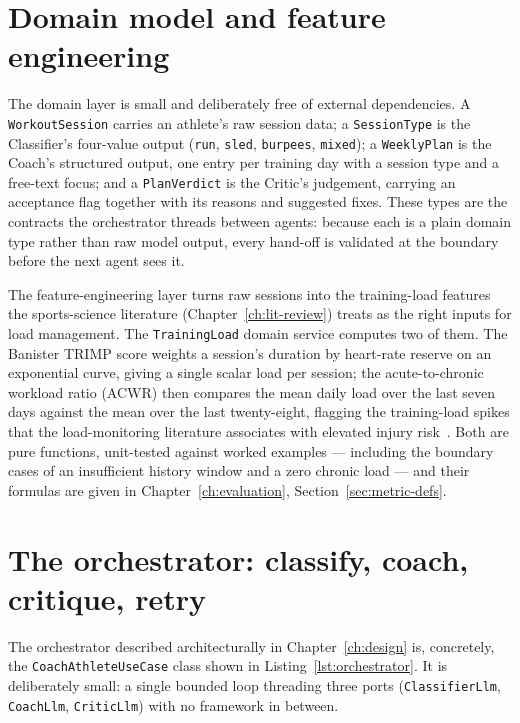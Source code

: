 \section{Domain model and feature engineering}

The domain layer is small and deliberately free of external dependencies. A \texttt{WorkoutSession} carries an athlete's raw session data; a \texttt{SessionType} is the Classifier's four-value output (\texttt{run}, \texttt{sled}, \texttt{burpees}, \texttt{mixed}); a \texttt{WeeklyPlan} is the Coach's structured output, one entry per training day with a session type and a free-text focus; and a \texttt{PlanVerdict} is the Critic's judgement, carrying an acceptance flag together with its reasons and suggested fixes. These types are the contracts the orchestrator threads between agents: because each is a plain domain type rather than raw model output, every hand-off is validated at the boundary before the next agent sees it.

The feature-engineering layer turns raw sessions into the training-load features the sports-science literature (Chapter~\ref{ch:lit-review}) treats as the right inputs for load management. The \texttt{TrainingLoad} domain service computes two of them. The Banister TRIMP score weights a session's duration by heart-rate reserve on an exponential curve, giving a single scalar load per session; the acute-to-chronic workload ratio (ACWR) then compares the mean daily load over the last seven days against the mean over the last twenty-eight, flagging the training-load spikes that the load-monitoring literature associates with elevated injury risk~\cite{gabbett2016}. Both are pure functions, unit-tested against worked examples --- including the boundary cases of an insufficient history window and a zero chronic load --- and their formulas are given in Chapter~\ref{ch:evaluation}, Section~\ref{sec:metric-defs}.

\section{The orchestrator: classify, coach, critique, retry}

The orchestrator described architecturally in Chapter~\ref{ch:design} is, concretely, the \texttt{CoachAthleteUseCase} class shown in Listing~\ref{lst:orchestrator}. It is deliberately small: a single bounded loop threading three ports (\texttt{ClassifierLlm}, \texttt{CoachLlm}, \texttt{CriticLlm}) with no framework in between.

